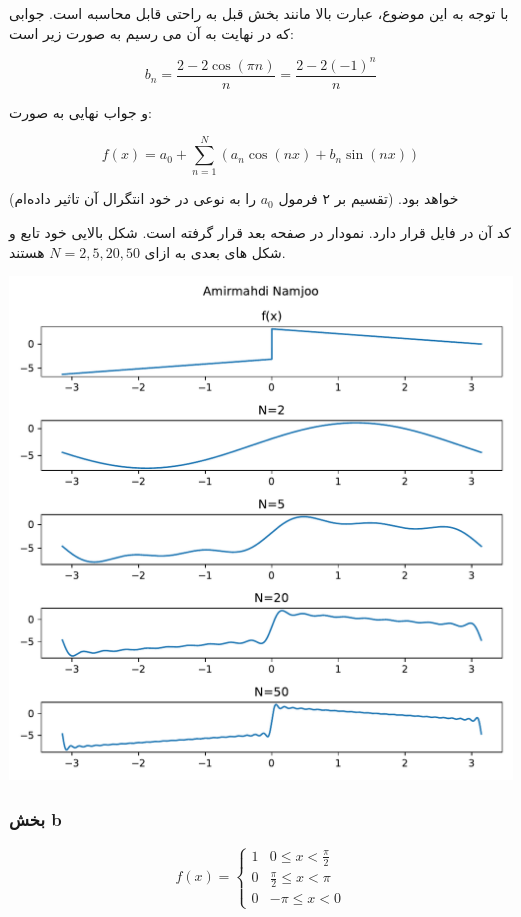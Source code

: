 \documentclass[12pt]{article}
\begin{document}
با توجه به این موضوع، عبارت بالا مانند بخش قبل به راحتی قابل محاسبه است. جوابی که در نهایت به آن می رسیم به صورت زیر است:


$$\boxed{b_n = \frac{2-2 \cos (\pi  n)}{n} = \frac{2 - 2 (-1)^n}{n}}$$


و جواب نهایی به صورت:

$$f(x) = a_0 + \sum_{n=1}^{N} (a_n \cos (n x) + b_n \sin (n x))$$

خواهد بود. (تقسیم بر ۲ فرمول $a_0$ را به نوعی در خود انتگرال آن تاثیر داده‌ام)

کد آن در فایل 
قرار دارد. نمودار در صفحه بعد قرار گرفته است. شکل بالایی خود تابع و شکل های بعدی به ازای $N=2,5,20,50$ هستند.

\begin{center}
	\includegraphics[width = 1.0 \textwidth]{images/1.pdf}
\end{center}


\newpage

\subsubsection{بخش b}

$$
f(x)=\left\{\begin{array}{lr}
	1 & 0 \leq x<\frac{\pi}{2} \\
	0 & \frac{\pi}{2} \leq x<\pi \\
	0 & -\pi \leq x<0
\end{array}\right.
$$
\end{document}
